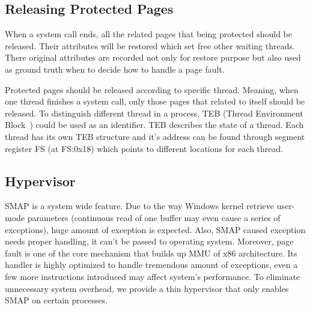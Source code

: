 \subsection{Releasing Protected Pages}

When a system call ends, all the related pages that being protected should be released. Their attributes will be restored which set free other waiting threads. There original attributes are recorded not only for restore purpose but also used as ground truth when to decide how to handle a page fault.

Protected pages should be released according to specific thread. Meaning, when one thread finishes a system call, only those pages that related to itself should be released. To distinguish different thread in a process, TEB (Thread Environment Block~\cite{teb}) could be used as an identifier. TEB describes the state of a thread. Each thread has its own TEB structure and it's address can be found through segment register FS (at FS:0x18) which points to different locations for each thread. 

\subsection{Hypervisor}

SMAP is a system wide feature. Due to the way Windows kernel retrieve user-mode parameters (continuous read of one buffer may even cause a series of exceptions), huge amount of exception is expected. Also, SMAP caused exception needs proper handling, it can't be passed to operating system. Moreover, page fault is one of the core mechanism that builds up MMU of x86 architecture. Its handler is highly optimized to handle tremendous amount of exceptions, even a few more instructions introduced may affect system's performance.  To eliminate unnecessary system overhead, we provide a thin hypervisor that only enables SMAP on certain processes.

